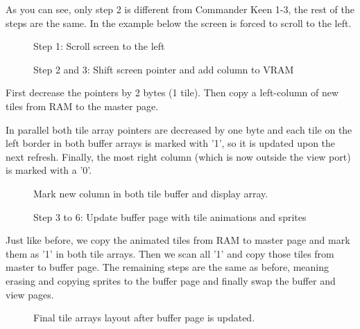 \documentclass[book.tex]{subfiles}
\begin{document}
As you can see, only step 2 is different from Commander Keen 1-3, the rest of the steps are the same. In the example below the screen is forced to scroll to the left.


\begin{figure}[H]
\centering
 \caption{Step 1: Scroll screen to the left}
 \label{fig:kc4_6_start}
\end{figure}

\pagebreak

\begin{figure}[H]
\centering
 \caption{Step 2 and 3: Shift screen pointer and add column to VRAM}
 \label{fig:kc4_6_add_column}
\end{figure}


First decrease the  pointers by 2 bytes (1 tile). Then copy a left-column of new tiles from RAM to the master page.\\
\par
In parallel both tile array pointers are decreased by one byte and each tile on the left border in both buffer arrays is marked with '1', so it is updated upon the next refresh.
Finally, the most right column (which is now outside the view port) is marked with a '0'.

\begin{figure}[H]
\centering
 \caption{Mark new column in both tile buffer and display array.}
 \label{fig:kc4_6_tile_final}
\end{figure}


\begin{figure}[H]
\centering
 \caption{Step 3 to 6: Update buffer page with tile animations and sprites}
 \label{fig:kc4_6_update_buffer}
\end{figure}


Just like before, we copy the animated tiles from RAM to master page and mark them as '1' in both tile arrays. Then we scan all '1' and copy those tiles from master to buffer page. The remaining steps are the same as before, meaning erasing and copying sprites to the buffer page and finally swap the buffer and view pages.

\begin{figure}[H]
\centering
 \caption{Final tile arrays layout after buffer page is updated.}
 \label{fig:kc4_6_update_array}
\end{figure}
\end{document}
